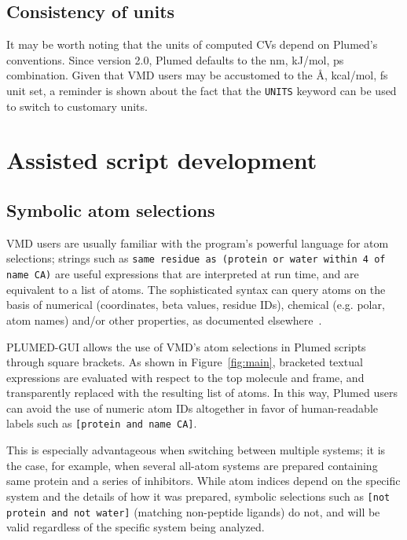 \documentclass[preprint,review,11pt]{elsarticle}
\begin{document}


\subsection{Consistency of units}

It may be worth noting that the units of computed CVs  depend on
Plumed's conventions.  Since version 2.0, Plumed defaults to the nm,
kJ/mol, ps combination. Given that VMD users may be accustomed to the
\AA, kcal/mol, fs unit set, a reminder is shown about the fact that
the \texttt{UNITS} keyword can be used to  switch to customary
units.



\section{Assisted script development}


\subsection{Symbolic atom selections}\label{sec:symb-atom-select}

VMD users are usually familiar with the program's powerful language
for atom selections; strings such as \texttt{same residue as (protein
  or water within 4 of name CA)} are useful expressions that are
interpreted at run time, and are equivalent to a list of atoms.  The
sophisticated syntax can query atoms on the basis of numerical
(coordinates, beta values, residue IDs), chemical (e.g. polar, atom
names) and/or other properties, as documented
elsewhere~\cite{Humphrey_Dalke_Schulten_1996}.

PLUMED-GUI allows the use of VMD's atom selections in Plumed scripts
through  square brackets. As shown in Figure~\ref{fig:main},
bracketed textual expressions  are evaluated with respect to
the top molecule and frame, and transparently replaced with the
resulting list of atoms. In this way, Plumed users can 
avoid the use of numeric atom IDs altogether in favor of human-readable
labels such as \texttt{[protein and name CA]}.

This is especially advantageous when switching between multiple
systems; it is the case, for example, when several all-atom systems
are prepared containing same protein and a series of inhibitors.
While atom indices depend on the specific system and the details of
how it was prepared, symbolic selections such as \texttt{[not protein
  and not water]} (matching non-peptide ligands) do not, and will be
valid regardless of the specific system being analyzed.
\end{document}
